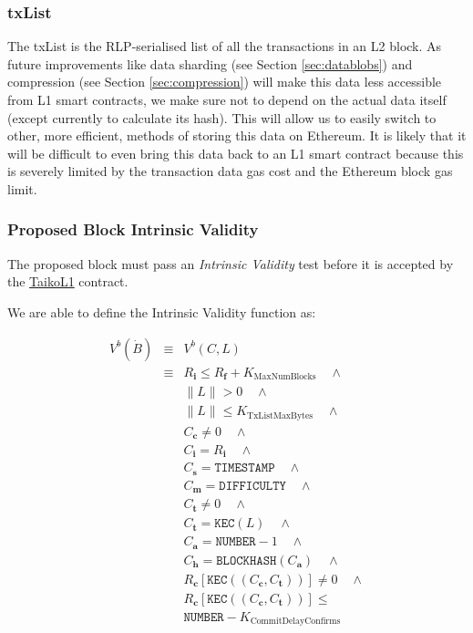 \documentclass[9pt,oneside]{amsart}
\begin{document}
\begin{multicols}{2}
\subsubsection{txList}\label{sec:txlist}
The txList is the RLP-serialised list of all the transactions in an L2 block. As future improvements like data sharding (see Section \ref{sec:datablobs}) and compression (see Section \ref{sec:compression}) will make this data less accessible from L1 smart contracts, we make sure not to depend on the actual data itself (except currently to calculate its hash). This will allow us to easily switch to other, more efficient, methods of storing this data on Ethereum. It is likely that it will be difficult to even bring this data back to an L1 smart contract because this is severely limited by the transaction data gas cost and the Ethereum block gas limit.

\subsubsection{Proposed Block Intrinsic Validity}
The proposed block must pass an \emph{Intrinsic Validity} test before it is accepted by the \underline{TaikoL1} contract. 

We are able to define the Intrinsic Validity function as:

\begin{eqnarray}
V^{b}(\dot{B}) & \equiv &   V^{b}(C,L)  \\
\nonumber & \equiv &   R_\mathbf{i} \le R_\mathbf{f} + K_\mathrm{MaxNumBlocks}   \quad \wedge \\
\nonumber& & \lVert L \rVert > 0 \quad \wedge \\
\nonumber & & \lVert L \rVert \le K_{\mathrm{TxListMaxBytes}} \quad \wedge \\
\nonumber& & C_{\mathbf{c}} \ne 0   \quad \wedge \\
\nonumber& & C_{\mathbf{i}} = R_\mathbf{i}   \quad \wedge \\
\nonumber& & C_{\mathbf{s}} = \texttt{TIMESTAMP}   \quad \wedge \\
\nonumber& & C_{\mathbf{m}} = \texttt{DIFFICULTY}   \quad \wedge \\
\nonumber& & C_{\mathbf{t}} \ne 0   \quad \wedge \\
\nonumber& & C_{\mathbf{t}} = \texttt{KEC}(L)   \quad \wedge \\
\nonumber& & C_{\mathbf{a}} = \texttt{NUMBER} - 1   \quad \wedge \\
\nonumber& & C_{\mathbf{h}} = \texttt{BLOCKHASH}(C_{\mathbf{a}})   \quad \wedge \\
\nonumber& & R_{\mathbf{c}}[\texttt{KEC}((C_{\mathbf{c}}, C_{\mathbf{t}}))] \ne 0  \quad \wedge \\
\nonumber& & R_{\mathbf{c}}[\texttt{KEC}((C_{\mathbf{c}}, C_{\mathbf{t}}))] \le  \\
\nonumber& &  \texttt{NUMBER}   -  K_{\mathrm{CommitDelayConfirms}}
\end{eqnarray}


\end{multicols}
\end{document}
